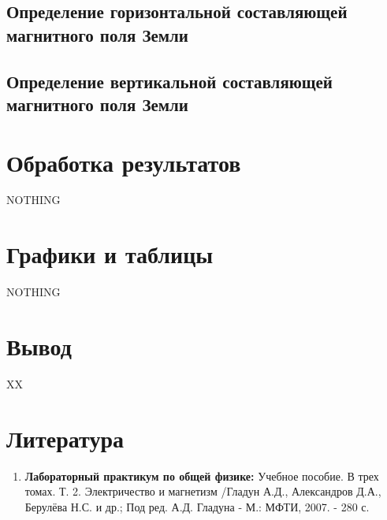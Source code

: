 \documentclass[a4paper, 12pt]{article}%
\begin{document}
\subsection{Определение горизонтальной составляющей магнитного поля Земли}



\subsection{Определение вертикальной составляющей магнитного поля Земли}

\section{Обработка результатов}

NOTHING

\section{Графики и таблицы}

NOTHING

\section{Вывод}

XX

\section{Литература}

\begin{enumerate}
\item \textbf{Лабораторный практикум по общей физике:} Учебное пособие. В трех томах. Т. 2. Электричество и магнетизм /Гладун А.Д., Александров Д.А., Берулёва Н.С. и др.; Под ред. А.Д. Гладуна - М.: МФТИ, 2007. - 280 с.
\end{enumerate}		
		
\end{document}
